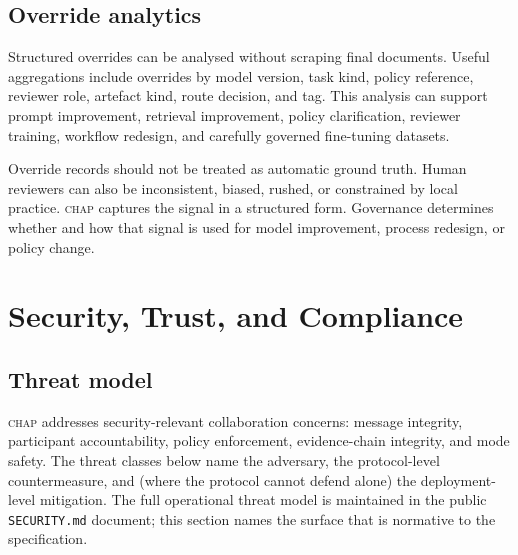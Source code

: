\documentclass[11pt]{article}
\newcommand{\chap}{\textsc{chap}}
\begin{document}
\subsection{Override analytics}

Structured overrides can be analysed without scraping final documents. Useful aggregations include overrides by model version, task kind, policy reference, reviewer role, artefact kind, route decision, and tag. This analysis can support prompt improvement, retrieval improvement, policy clarification, reviewer training, workflow redesign, and carefully governed fine-tuning datasets.

Override records should not be treated as automatic ground truth. Human reviewers can also be inconsistent, biased, rushed, or constrained by local practice. \chap{} captures the signal in a structured form. Governance determines whether and how that signal is used for model improvement, process redesign, or policy change.

\section{Security, Trust, and Compliance}
\label{sec:security}

\subsection{Threat model}

\chap{} addresses security-relevant collaboration concerns: message integrity, participant accountability, policy enforcement, evidence-chain integrity, and mode safety. The threat classes below name the adversary, the protocol-level countermeasure, and (where the protocol cannot defend alone) the deployment-level mitigation. The full operational threat model is maintained in the public \texttt{SECURITY.md} document; this section names the surface that is normative to the specification.
\end{document}
